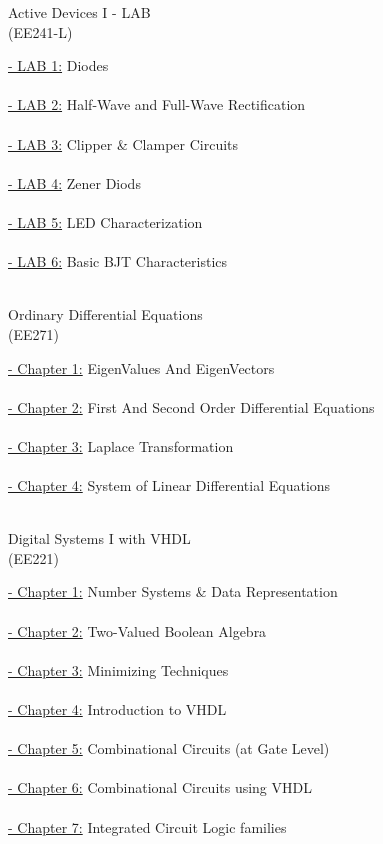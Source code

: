 \documentclass[12pt, a4paper]{article}
\begin{document}
\newpage 
\begin{center}
\Huge 
Active Devices I - LAB  \\ (EE241-L)
\end{center}
\normalsize
\large \underline{- LAB 1:} Diodes \\ \\
\large \underline{- LAB 2:} Half-Wave  and Full-Wave Rectification \\ \\
\large \underline{- LAB 3:} Clipper \& Clamper Circuits\\ \\
\large \underline{- LAB 4:} Zener Diods \\ \\
\large \underline{- LAB 5:} LED Characterization \\ \\
\large \underline{- LAB 6:} Basic BJT Characteristics \\ \\


\newpage 
\begin{center}
\Huge 
Ordinary Differential Equations \\ (EE271)
\end{center}
\normalsize
\large \underline{- Chapter 1:} EigenValues And EigenVectors\\ \\
\large \underline{- Chapter 2:} First And Second Order Differential Equations\\ \\ 
\large \underline{- Chapter 3:} Laplace Transformation\\ \\ 
\large \underline{- Chapter 4:} System of Linear Differential Equations\\ \\ 


\newpage 
\begin{center}
\Huge 
Digital Systems I with VHDL\\ (EE221)
\end{center}
\normalsize
\large \underline{- Chapter 1:} Number Systems \& Data Representation\\ \\
\large \underline{- Chapter 2:} Two-Valued Boolean Algebra\\ \\
\large \underline{- Chapter 3:} Minimizing Techniques\\ \\
\large \underline{- Chapter 4:} Introduction to VHDL\\ \\
\large \underline{- Chapter 5:} Combinational Circuits (at Gate Level)\\ \\
\large \underline{- Chapter 6:} Combinational Circuits using VHDL\\ \\
\large \underline{- Chapter 7:} Integrated Circuit Logic families\\ \\
\end{document}

